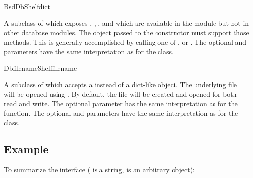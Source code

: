 \begin{classdesc}{BsdDbShelf}{dict}

A subclass of  which exposes ,
, ,  and
 which are available in the  module
but not in other database modules.  The  object passed to
the constructor must support those methods.  This is generally
accomplished by calling one of ,
 or .  The optional
 and  parameters have the
same interpretation as for the  class.

\end{classdesc}

\begin{classdesc}{DbfilenameShelf}{filename}

A subclass of  which accepts a  instead of
a dict-like object.  The underlying file will be opened using
{}.  By default, the file will be created and
opened for both read and write.  The optional  parameter has
the same interpretation as for the  function.  The
optional  and  parameters
have the same interpretation as for the  class.
 
\end{classdesc}

\subsection{Example}

To summarize the interface ( is a string,  is an
arbitrary object):

